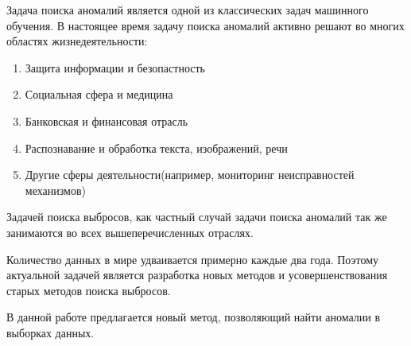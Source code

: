 \Introduction

Задача поиска аномалий является одной из классических задач машинного обучения. В настоящее время задачу поиска аномалий активно решают во многих областях жизнедеятельности:
\begin{enumerate} 
	\item Защита информации и безопастность
	\item Социальная сфера и медицина
	\item Банковская и финансовая отрасль
	\item Распознавание и обработка текста, изображений, речи
	\item Другие сферы деятельности(например, мониторинг неисправностей механизмов)
\end{enumerate}
Задачей поиска выбросов, как частный случай задачи поиска аномалий так же занимаются во всех вышеперечисленных отраслях. 

Количество данных в мире удваивается примерно каждые два года\cite{def04}. Поэтому актуальной задачей является разработка новых методов и усовершенствования старых методов поиска выбросов.

В данной работе предлагается новый метод, позволяющий найти аномалии в выборках данных.


                                                                                                                                                                                                                                                                                                                    

